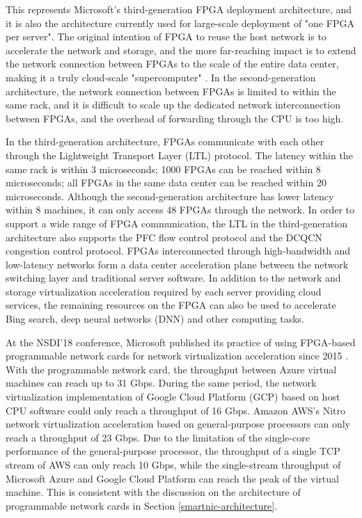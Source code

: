 This represents Microsoft's third-generation FPGA deployment architecture, and it is also the architecture currently used for large-scale deployment of "one FPGA per server". The original intention of FPGA to reuse the host network is to accelerate the network and storage, and the more far-reaching impact is to extend the network connection between FPGAs to the scale of the entire data center, making it a truly cloud-scale "supercomputer" \cite{configurable-cloud-acceleration}. In the second-generation architecture, the network connection between FPGAs is limited to within the same rack, and it is difficult to scale up the dedicated network interconnection between FPGAs, and the overhead of forwarding through the CPU is too high.

In the third-generation architecture, FPGAs communicate with each other through the Lightweight Transport Layer (LTL) protocol. The latency within the same rack is within 3 microseconds; 1000 FPGAs can be reached within 8 microseconds; all FPGAs in the same data center can be reached within 20 microseconds. Although the second-generation architecture has lower latency within 8 machines, it can only access 48 FPGAs through the network. In order to support a wide range of FPGA communication, the LTL in the third-generation architecture also supports the PFC flow control protocol and the DCQCN congestion control protocol.
FPGAs interconnected through high-bandwidth and low-latency networks form a data center acceleration plane between the network switching layer and traditional server software. In addition to the network and storage virtualization acceleration required by each server providing cloud services, the remaining resources on the FPGA can also be used to accelerate Bing search, deep neural networks (DNN) and other computing tasks.

At the NSDI'18 conference, Microsoft published its practice of using FPGA-based programmable network cards for network virtualization acceleration since 2015 \cite{smartnic}. With the programmable network card, the throughput between Azure virtual machines can reach up to 31 Gbps. During the same period, the network virtualization implementation of Google Cloud Platform (GCP) based on host CPU software \cite{andromeda} could only reach a throughput of 16 Gbps. Amazon AWS's Nitro network virtualization acceleration based on general-purpose processors \cite{nitro-talk} can only reach a throughput of 23 Gbps. Due to the limitation of the single-core performance of the general-purpose processor, the throughput of a single TCP stream of AWS can only reach 10 Gbps, while the single-stream throughput of Microsoft Azure and Google Cloud Platform can reach the peak of the virtual machine. This is consistent with the discussion on the architecture of programmable network cards in Section \ref{smartnic-architecture}.

